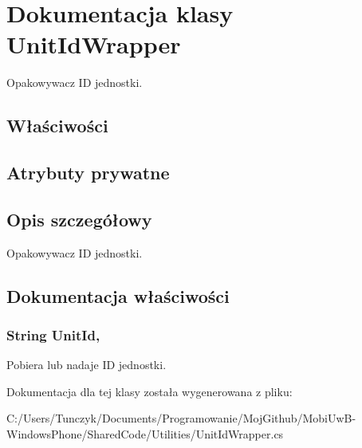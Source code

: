 \hypertarget{a00080}{}\section{Dokumentacja klasy Unit\+Id\+Wrapper}
\label{a00080}


Opakowywacz I\+D jednostki.  


\subsection*{Właściwości}
\subsection*{Atrybuty prywatne}


\subsection{Opis szczegółowy}
Opakowywacz I\+D jednostki. 



\subsection{Dokumentacja właściwości}
\hypertarget{a00080_a7b0600d2bfdd2eae56b411c8f2d58fa1}{}
\subsubsection[{Unit\+Id}]{\setlength{\rightskip}{0pt plus 5cm}String Unit\+Id\hspace{0.3cm}{\ttfamily [get]}, {\ttfamily [set]}}\label{a00080_a7b0600d2bfdd2eae56b411c8f2d58fa1}


Pobiera lub nadaje I\+D jednostki. 



Dokumentacja dla tej klasy została wygenerowana z pliku\+:\begin{DoxyCompactItemize}
\item 
C\+:/\+Users/\+Tunczyk/\+Documents/\+Programowanie/\+Moj\+Github/\+Mobi\+Uw\+B-\/\+Windows\+Phone/\+Shared\+Code/\+Utilities/Unit\+Id\+Wrapper.\+cs\end{DoxyCompactItemize}

